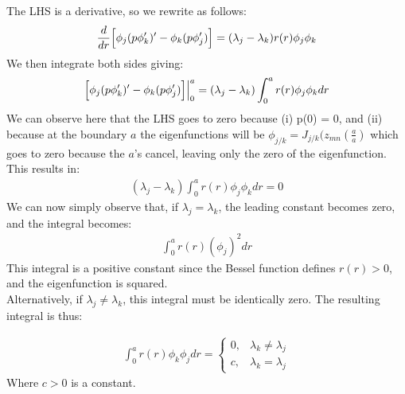 \documentclass{article}
\begin{document}
The LHS is a derivative, so we rewrite as follows:
\begin{equation}
\begin{aligned}
\frac{d}{dr} \Big{[}\phi_j(p\phi_k')' - \phi_k(p\phi_j') \Big{]} = (\lambda_j - \lambda_k)r(r)\phi_j\phi_k\\
\end{aligned}
\end{equation}
We then integrate both sides giving:
\begin{equation}
\begin{aligned}
\Big{[}\phi_j(p\phi_k')' - \phi_k(p\phi_j') \Big{]}\Big{|}_0^a = (\lambda_j - \lambda_k)\int_0^ar(r)\phi_j\phi_kdr\\
\end{aligned}
\end{equation}
We can observe here that the LHS goes to zero because (i) p(0) = 0, and (ii) because at the boundary $a$ the eigenfunctions will be $\phi_{j/k} = J_{j/k}(z_{mn}(\frac{a}{a})$ which goes to zero because the $a$'s cancel, leaving only the zero of the eigenfunction. This results in:
\begin{equation}
 \begin{aligned}
 (\lambda_j - \lambda_k)\int_0^ar(r)\phi_j\phi_kdr = 0
\end{aligned}
\end{equation}
We can now simply observe that, if $\lambda_j = \lambda_k$, the leading constant becomes zero, and the integral becomes:
\begin{equation}
\begin{aligned}
\int_0^ar(r)(\phi_j)^2dr
\end{aligned}
\end{equation}
This integral is a positive constant since the Bessel function defines $r(r)>0$, and the eigenfunction is squared.
\\
Alternatively, if $\lambda_j \neq \lambda_k$, this integral must be identically zero. The resulting integral is thus:
\begin{tcolorbox}[minipage,colback=white,arc=0pt,outer arc=0pt]
\begin{equation}
\begin{aligned}
\int_0^ar(r)\phi_k\phi_j dr =
 \begin{cases} 
      0, & \lambda_k \neq \lambda_j \\
      c, & \lambda_k = \lambda_j
   \end{cases}
\end{aligned}
\end{equation}
Where $c>0$ is a constant.
\end{tcolorbox}
\end{document}
